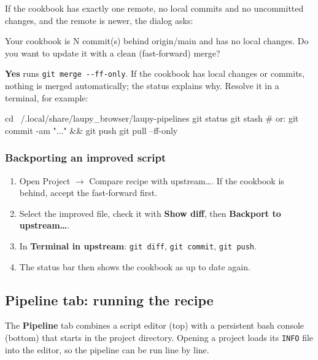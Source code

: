 \documentclass[11pt,a4paper]{article}
\newcommand{\cmd}[1]{\texttt{#1}}
\newcommand{\ui}[1]{\textsf{\textbf{#1}}}
\newcommand{\menu}[1]{\textsf{#1}}
\begin{document}
If the cookbook has exactly one remote, no local commits and no uncommitted changes, and the remote
is newer, the dialog asks:

\begin{note}
Your cookbook is N commit(s) behind origin/main and has no local changes. Do you want to update it
with a clean (fast-forward) merge?
\end{note}

\ui{Yes} runs \cmd{git merge -{}-ff-only}. If the cookbook has local changes or commits, nothing
is merged automatically; the status explains why. Resolve it in a terminal, for example:

\begin{terminal}
cd ~/.local/share/laupy_browser/laupy-pipelines
git status
git stash            # or: git commit -am "..."  && git push
git pull --ff-only
\end{terminal}

\subsubsection*{Backporting an improved script}

\begin{enumerate}
  \item Open \menu{Project $\rightarrow$ Compare recipe with upstream\ldots}. If the cookbook is
    behind, accept the fast-forward first.
  \item Select the improved file, check it with \ui{Show diff}, then \ui{Backport to upstream\ldots}.
  \item In \ui{Terminal in upstream}: \cmd{git diff}, \cmd{git commit}, \cmd{git push}.
  \item The status bar then shows the cookbook as up to date again.
\end{enumerate}

\subsection{Pipeline tab: running the recipe}\label{sec:pipelinetab}

The \ui{Pipeline} tab combines a script editor (top) with a persistent bash console (bottom) that
starts in the project directory. Opening a project loads its \cmd{INFO} file into the editor, so
the pipeline can be run line by line.
\end{document}
